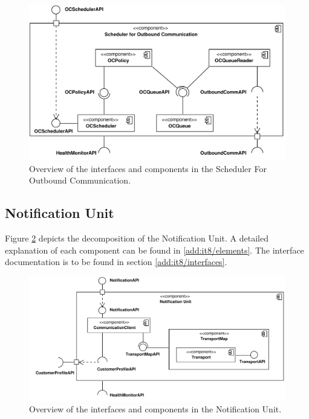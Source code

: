 \begin{figure}
	\begin{centering}
		\includegraphics[width=\textwidth]{figs/add-it7-interfaces.pdf}
		\caption{Overview of the interfaces and components in the Scheduler For
		Outbound Communication.}
		\label{fig:final-architecture/it7}
	\end{centering}
\end{figure}

\subsection{Notification Unit}

\npar Figure \ref{fig:final-architecture/it8} depicts the decomposition of the
Notification Unit. A detailed explanation of each component can be found in
\ref{add:it8/elements}. The interface documentation is to be found in section
\ref{add:it8/interfaces}.

\begin{figure}
	\begin{centering}
		\includegraphics[width=\textwidth]{figs/add-it8-interfaces.pdf}
		\caption{Overview of the interfaces and components in the Notification Unit.}
		\label{fig:final-architecture/it8}
	\end{centering}
\end{figure}

